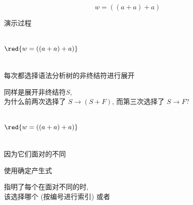 \begin{frame}{}
  \begin{center}
    
    \[
      w = ((a + a) + a)
    \]
  \end{center}
\end{frame}

\begin{frame}{}
  \begin{center}
    演示过程

    \begin{columns}
        

        \vspace{-0.80cm}
        \[
          \red{w = ((a + a) + a)}
        \]
    \end{columns}

    \pause
    \vspace{0.30cm}
    每次都选择语法分析树的非终结符进行展开
  \end{center}
\end{frame}

\begin{frame}{}
  \begin{center}
    同样是展开非终结符$S$, \\[4pt]
    为什么前两次选择了 $S \to (S + F)$, 而第三次选择了 $S \to F$?

    \begin{columns}
        

        \vspace{-0.80cm}
        \[
          \red{w = ((a + a) + a)}
        \]
    \end{columns}

    \pause
    \vspace{0.50cm}
    因为它们面对的不同
  \end{center}
\end{frame}

\begin{frame}{}
  \begin{center}
    {\large 使用确定产生式}
    

    
    指明了每个在面对不同的时, \\[4pt]
    该选择哪个 (按编号进行索引) 或者
  \end{center}
\end{frame}

